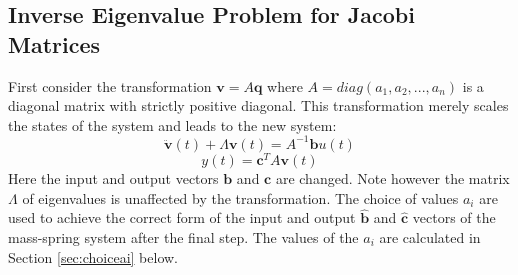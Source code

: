 \documentclass{beamer}
\begin{document}
\subsection{Inverse Eigenvalue Problem for Jacobi Matrices}
\begin{frame}

First consider the transformation $\mathbf{v} = A \mathbf{q}$ where $A = diag(a_1, a_2, ..., a_n)$ is a diagonal matrix with strictly positive diagonal.
This transformation merely scales the states of the system and leads to the new system:
\begin{equation}
\ddot{\mathbf{v}}(t) +  \Lambda \mathbf{v}(t) =  A^{-1} \mathbf{b}u(t)
\label{eq:scaled1}
\end{equation}
\begin{equation}
y(t) = \mathbf{c}^T  A \mathbf{v}(t)
\label{eq:scaled2}
\end{equation}
Here the input and output vectors $\mathbf{b}$ and $\mathbf{c}$ are changed. Note however the matrix $\Lambda$ of eigenvalues is unaffected by the transformation.
The choice of values $a_i$ are used to achieve the correct form of the input and output $\mathbf{\hat{b}}$ and $\mathbf{\hat{c}}$ vectors of the mass-spring system after the final step.
The values of the $a_i$ are calculated in Section \ref{sec:choiceai} below.
\end{frame}
\end{document}
